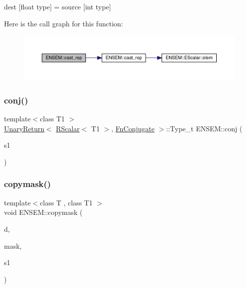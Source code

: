 dest \mbox{[}float type\mbox{]} = source \mbox{[}int type\mbox{]} 

Here is the call graph for this function\+:\nopagebreak
\begin{figure}[H]
\begin{center}
\leavevmode
\includegraphics[width=350pt]{d9/ded/group__rscalar_ga7fc2c1b07bacdd72df1204c120ace7a0_cgraph}
\end{center}
\end{figure}
\mbox{\label{group__rscalar_ga24609fe5d05b5967e364924ef6d13929}} 
\subsubsection{\texorpdfstring{conj()}{conj()}}
{\footnotesize\ttfamily template$<$class T1 $>$ \\
\mbox{\hyperlink{structENSEM_1_1UnaryReturn}{Unary\+Return}}$<$ \mbox{\hyperlink{classENSEM_1_1RScalar}{R\+Scalar}}$<$ T1 $>$, \mbox{\hyperlink{structENSEM_1_1FnConjugate}{Fn\+Conjugate}} $>$\+::Type\+\_\+t E\+N\+S\+E\+M\+::conj (\begin{DoxyParamCaption}\item[{const \mbox{\hyperlink{classENSEM_1_1RScalar}{R\+Scalar}}$<$ T1 $>$ \&}]{s1 }\end{DoxyParamCaption})\hspace{0.3cm}{\ttfamily [inline]}}

\mbox{\label{group__rscalar_ga2bfebcfc9a340228eb6b4449967f1fa0}} 
\subsubsection{\texorpdfstring{copymask()}{copymask()}}
{\footnotesize\ttfamily template$<$class T , class T1 $>$ \\
void E\+N\+S\+E\+M\+::copymask (\begin{DoxyParamCaption}\item[{\mbox{\hyperlink{classENSEM_1_1RScalar}{R\+Scalar}}$<$ T $>$ \&}]{d,  }\item[{const \mbox{\hyperlink{classENSEM_1_1RScalar}{R\+Scalar}}$<$ T1 $>$ \&}]{mask,  }\item[{const \mbox{\hyperlink{classENSEM_1_1RScalar}{R\+Scalar}}$<$ T $>$ \&}]{s1 }\end{DoxyParamCaption})\hspace{0.3cm}{\ttfamily [inline]}}



